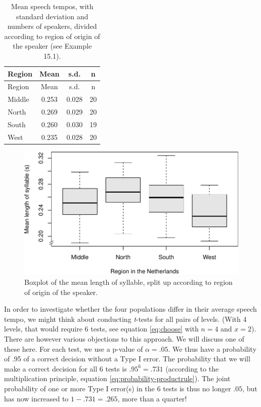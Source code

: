 \documentclass[
]{book}
\begin{document}
\begin{longtable}[]{@{}lccc@{}}
\caption{\label{tab:sylduration} Mean speech tempos, with standard deviation and numbers
of speakers, divided according to region of origin of the speaker (see Example
15.1).}\tabularnewline
\toprule\noalign{}
Region & Mean & s.d. & n \\
\midrule\noalign{}
\endfirsthead
\toprule\noalign{}
Region & Mean & s.d. & n \\
\midrule\noalign{}
\endhead
\bottomrule\noalign{}
\endlastfoot
Middle & 0.253 & 0.028 & 20 \\
North & 0.269 & 0.029 & 20 \\
South & 0.260 & 0.030 & 19 \\
West & 0.235 & 0.028 & 20 \\
\end{longtable}

\begin{figure}
\centering
\includegraphics{QMS-EN_files/figure-latex/sylduration-boxplot-1.pdf}
\caption{\label{fig:sylduration-boxplot}Boxplot of the mean length of syllable, split up according to region of origin of the speaker.}
\end{figure}

In order to investigate whether the four populations differ in their average
speech tempo, we might think about conducting \emph{t}-tests for all pairs
of levels. (With 4 levels, that would require 6 tests, see
equation \eqref{eq:choose} with \(n=4\) and \(x=2\)). There are however various
objections to this approach. We will discuss one of these here. For
each test, we use a p-value of \(\alpha=.05\).
We thus have a probability of .95 of a correct decision without a Type I error.
The probability that we will make a correct decision for all 6 tests is
\(.95^6 = .731\) (according to the multiplication principle,
equation \eqref{eq:probability-productrule}).
The joint probability of one or more
Type I error(s) in the 6 tests is thus no longer \(.05\), but has now
increased to \(1-.731 = .265\), more than a quarter!
\end{document}

